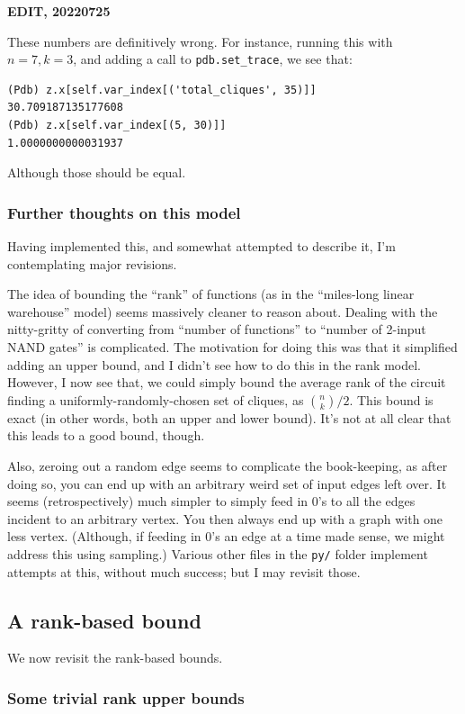 \documentclass[12pt]{article}
\theoremstyle{definition}
\begin{document}
{\bf EDIT, 20220725}

These numbers are definitively wrong. For instance, running
this with $n=7, k=3$, and adding a call to {\tt pdb.set\_trace},
we see that:

\begin{verbatim}
(Pdb) z.x[self.var_index[('total_cliques', 35)]]
30.709187135177608
(Pdb) z.x[self.var_index[(5, 30)]]
1.0000000000031937
\end{verbatim}

Although those should be equal.

\subsubsection{Further thoughts on this model}

Having implemented this, and somewhat attempted to describe it,
I'm contemplating major revisions.

The idea of bounding the ``rank'' of functions (as in the
``miles-long linear warehouse'' model) seems massively cleaner to reason about.
Dealing with the nitty-gritty of converting from ``number of functions''
to ``number of 2-input NAND gates'' is complicated. The motivation
for doing this was that it simplified adding an upper bound, and I
didn't see how to do this in the rank model.
However, I now see that, we could simply bound the
average rank of the circuit finding a uniformly-randomly-chosen set of cliques, as
${n \choose k}/2$. This bound is exact (in other words, both an
upper and lower bound). It's not at all clear that this leads to a good bound, though.

Also, zeroing out a random edge seems to complicate the book-keeping,
as after doing so, you can end up with an arbitrary weird set of
input edges left over. It seems (retrospectively) much simpler to
simply feed in 0's to all the edges incident to an arbitrary vertex.
You then always end up with a graph with one less vertex.
(Although, if feeding in 0's an edge at a time made sense, we might
address this using sampling.)
Various other files in the {\tt py/} folder implement attempts at
this, without much success; but I may revisit those.


\subsection{A rank-based bound}

We now revisit the rank-based bounds.

\subsubsection{Some trivial rank upper bounds}
\end{document}
